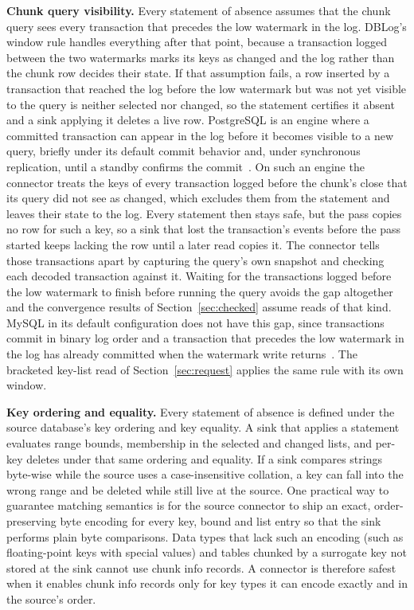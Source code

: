 \documentclass[sigconf,nonacm,10pt]{acmart}
\begin{document}
\textbf{Chunk query visibility.} Every statement of absence assumes that the
chunk query sees every transaction that precedes the low watermark in the log.
DBLog's window rule handles everything after that point, because a transaction
logged between the two watermarks marks its keys as changed and the log rather
than the chunk row decides their state. If that assumption fails, a row
inserted by a transaction that reached the log before the low watermark but was
not yet visible to the query is neither selected nor changed, so the statement
certifies it absent and a sink applying it deletes a live row. PostgreSQL is an
engine where a committed transaction can appear in the log before it becomes visible to a new query, briefly under
its default commit behavior and, under synchronous replication, until a standby
confirms the commit~\cite{postgres_xact_source}. On such an engine the connector treats the keys of every transaction logged
before the chunk's close that its query did not see as changed, which excludes
them from the statement and leaves their state to the log. Every statement then
stays safe, but the pass copies no row for such a key, so a sink that lost the
transaction's events before the pass started keeps lacking the row until a
later read copies it. The connector tells those transactions apart by
capturing the query's own snapshot and checking each decoded transaction
against it. Waiting for the transactions logged before the low watermark to
finish before running the query avoids the gap altogether and the convergence
results of Section~\ref{sec:checked} assume reads of that kind. MySQL in its
default configuration does not have this gap, since transactions commit in
binary log order and a transaction that precedes the low watermark in the log
has already committed when the watermark write
returns~\cite{mysql_binlog_expire}. The bracketed key-list read of
Section~\ref{sec:request} applies the same rule with its own window.

\textbf{Key ordering and equality.} Every statement of absence is defined under
the source database's key ordering and key equality. A sink that applies a
statement evaluates range bounds, membership in the selected and changed lists,
and per-key deletes under that same ordering and equality. If a sink compares strings byte-wise while the source
uses a case-insensitive collation, a key can fall into the wrong range and be
deleted while still live at the source. One practical way to guarantee matching
semantics is for the source connector to ship an exact, order-preserving byte encoding
for every key, bound and list entry so that the sink performs plain byte
comparisons. Data types that lack such an encoding (such as floating-point keys with special
values) and tables chunked by a surrogate key not stored at the sink cannot use
chunk info records. A connector is therefore safest when it enables chunk info
records only for key types it can encode exactly and in the source's order.
\end{document}
